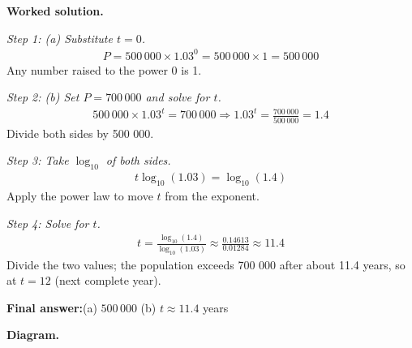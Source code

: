 \documentclass[11pt]{article}
\begin{document}
\textbf{Worked solution.}

\textit{Step 1: (a) Substitute \( t = 0 \).}
\[\begin{gathered}
P = 500\,000 \times 1.03^0 = 500\,000 \times 1 = 500\,000
\end{gathered}\]
Any number raised to the power 0 is 1.

\textit{Step 2: (b) Set \( P = 700\,000 \) and solve for \( t \).}
\[\begin{gathered}
500\,000 \times 1.03^t = 700\,000 \Rightarrow 1.03^t = \frac{700\,000}{500\,000} = 1.4
\end{gathered}\]
Divide both sides by 500 000.

\textit{Step 3: Take \( \log_{10} \) of both sides.}
\[\begin{gathered}
t\log_{10}(1.03) = \log_{10}(1.4)
\end{gathered}\]
Apply the power law to move \( t \) from the exponent.

\textit{Step 4: Solve for \( t \).}
\[\begin{gathered}
t = \frac{\log_{10}(1.4)}{\log_{10}(1.03)} \approx \frac{0.14613}{0.01284} \approx 11.4
\end{gathered}\]
Divide the two values; the population exceeds 700 000 after about 11.4 years, so at \( t = 12 \) (next complete year).

\begin{answerbox}
\textbf{Final answer:}\quad (a) \(\displaystyle  500\,000 \) \quad  (b) \(\displaystyle  t \approx 11.4 \) years
\end{answerbox}
\textbf{Diagram.}
\end{document}
